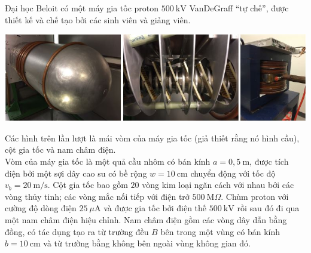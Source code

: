 \begin{vd}
Đại học Beloit có một máy gia tốc proton $500 ~\mathrm{kV}$ VanDeGraff ``tự chế'', được thiết kế và chế tạo bởi các sinh viên và giảng viên.
\begin{center}
    \includegraphics[scale=0.65]{Anh/ngoc3.JPG}
\end{center}
    Các hình trên lần lượt là mái vòm của máy gia tốc (giả thiết rằng nó hình cầu), cột gia tốc và nam châm điện.\\

Vòm của máy gia tốc là một quả cầu nhôm có bán kính $a=0,5~\mathrm{m}$, được tích điện bởi một sợi dây cao su có bề rộng $w=10~\mathrm{cm}$ chuyển động với tốc độ $v_b=20~\mathrm{m/s}$. Cột gia tốc bao gồm $20$ vòng kim loại ngăn cách với nhau bởi các vòng thủy tinh; các vòng mắc nối tiếp với điện trở $500~\mathrm{M}\Omega$. Chùm proton với cường độ dòng điện $25~\mu \mathrm{A}$ và được gia tốc bởi điện thế $500~\mathrm{kV}$ rồi sau đó đi qua một nam châm điện hiệu chỉnh. Nam châm điện gồm các vòng dây dẫn bằng đồng, có tác dụng tạo ra từ trường đều $B$ bên trong một vùng có bán kính $b=10~\mathrm{cm}$ và từ trường bằng không bên ngoài vùng không gian đó.
\begin{center}
 


\begin{tikzpicture}[x=0.75pt,y=0.75pt,yscale=-1,xscale=1]


\end{tikzpicture}
\end{center}
\end{vd}
